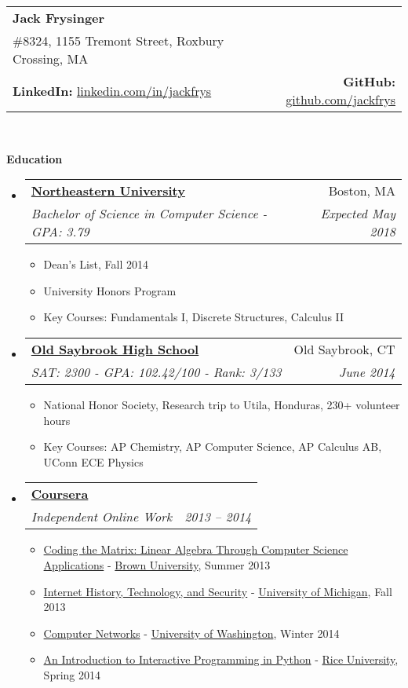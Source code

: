 \documentclass[letterpaper,10pt]{article}
\makeatletter
\newcommand{\resitem}[1]{\item #1 \vspace{-2pt}}
\newcommand{\resheading}[1]{{\large \colorbox{mygrey}{\begin{minipage}{\textwidth}{\textbf{#1 \vphantom{p\^{E}}}}\end{minipage}}}}
\newcommand{\ressubheading}[4]{
\begin{tabular*}{6.8in}{l@{\extracolsep{\fill}}r}
		\textbf{#1} & #2 \\
		\textit{#3} & \textit{#4} \\
\end{tabular*}\vspace{-6pt}}
\makeatother
\begin{document}
\newcommand{\mywebheader}{
\begin{tabular*}{7in}{l@{\extracolsep{\fill}}r}
	\textbf{\LARGE Jack Frysinger} & %
	\\
	\#8324, 1155 Tremont Street, Roxbury Crossing, MA %
	\\
	\textbf{LinkedIn:} \href{http://linkedin.com/in/jackfrys}{linkedin.com/in/jackfrys} & \textbf{GitHub:} \href{https://github.com/jackfrys}{github.com/jackfrys} \\
	\end{tabular*}
\\
\vspace{0.1in}}

\mywebheader

\resheading{Education}
	\begin{itemize}[leftmargin=*]
		\item[]
			\ressubheading{\href{http://www.northeastern.edu}{Northeastern University}}{Boston, MA}{{Bachelor of Science in Computer Science - }{GPA: 3.79}}{Expected May 2018}
				{ \footnotesize
				\begin{itemize}
					\resitem{Dean's List, Fall 2014}
					\resitem{University Honors Program}
					\resitem{Key Courses: Fundamentals I, Discrete Structures, Calculus II}
				\end{itemize}}
		\item[]
			\ressubheading{\href{http://oldsaybrook.k12.ct.us/hs}{Old Saybrook High School}}{Old Saybrook, CT}{{SAT: 2300 - }{GPA: 102.42/100 - Rank: 3/133}}{June 2014}
			{\footnotesize
			\begin{itemize}
				\resitem{National Honor Society, Research trip to Utila, Honduras, 230+ volunteer hours}
				\resitem{Key Courses: AP Chemistry, AP Computer Science, AP Calculus AB, UConn ECE Physics}
			\end{itemize}}
		\item[]
			\ressubheading{\href{http://coursera.com}{Coursera}}{}{Independent Online Work}{2013 -- 2014}
				{\footnotesize
				\begin{itemize}
					\resitem{\href{https://coursera.org/course/matrix}{Coding the Matrix: Linear Algebra Through Computer Science Applications} - \href{http://brown.edu}{Brown University}, Summer 2013}
					\resitem{\href{https://coursera.org/course/insidetheinternet}{Internet History, Technology, and Security} - \href{http://umich.edu}{University of Michigan}, Fall 2013}
					\resitem{\href{https://coursera.org/course/comnetworks}{Computer Networks} - \href{http://uw.edu}{University of Washington}, Winter 2014}
					\resitem{\href{https://coursera.org/course/interactivepython}{An Introduction to Interactive Programming in Python} - \href{http://rice.edu}{Rice University}, Spring 2014}
				\end{itemize}}
	\end{itemize} %
\end{document}
